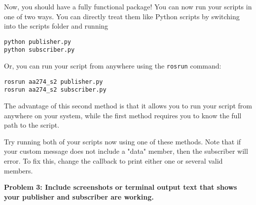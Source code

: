 Now, you should have a fully functional package! You can now run your scripts in one of two ways. You can directly treat them like Python scripts by switching into the scripts folder and running 

\begin{lstlisting}
python publisher.py
python subscriber.py
\end{lstlisting}

Or, you can run your script from anywhere using the \texttt{rosrun} command:

\begin{lstlisting}
rosrun aa274_s2 publisher.py
rosrun aa274_s2 subscriber.py
\end{lstlisting}
The advantage of this second method is that it allows you to run your script from anywhere on your system, while the first method requires you to know the full path to the script.

Try running both of your scripts now using one of these methods. Note that if your custom message does not include a "data" member, then the subscriber will error. To fix this, change the callback to print either one or several valid members.

\textbf{Problem 3: Include screenshots or terminal output text that shows your publisher and subscriber are working.}






